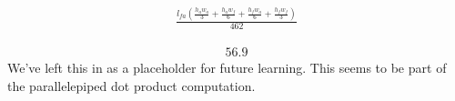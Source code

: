 \documentclass[letterpaper,10pt,english]{sphinxmanual}
\begin{document}
\begin{sphinxVerbatim}[commandchars=\\\{\}]
  \PYG{p}{[}   \PYG{p}{]}
\end{sphinxVerbatim}
\begin{equation*}
\begin{split}\displaystyle \frac{l_{fa} \left(\frac{h_{a} w_{a}}{3} + \frac{h_{a} w_{f}}{6} + \frac{h_{f} w_{a}}{6} + \frac{h_{f} w_{f}}{3}\right)}{462}\end{split}
\end{equation*}
\begin{sphinxVerbatim}[commandchars=\\\{\}]
\end{sphinxVerbatim}
\begin{equation*}
\begin{split}\displaystyle 56.9\end{split}
\end{equation*}
\sphinxAtStartPar
We’ve left this in as a placeholder for future learning. This seems to be part of the parallelepiped dot product computation.
\end{document}
